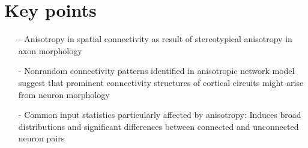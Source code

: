 \section*{Key points}
\vspace{-0.5cm}
\begin{itemize}[leftmargin=1.3cm]
\item[-] Anisotropy in spatial connectivity as result of stereotypical
  anisotropy in axon morphology
\item[-] Nonrandom connectivity patterns identified in anisotropic
  network model suggest that prominent connectivity structures of cortical
  circuits might arise from neuron morphology
\item[-] Common input statistics particularly affected by anisotropy:
  Induces broad distributions and significant differences between
  connected and unconnected neuron pairs
\end{itemize}

\bigskip






